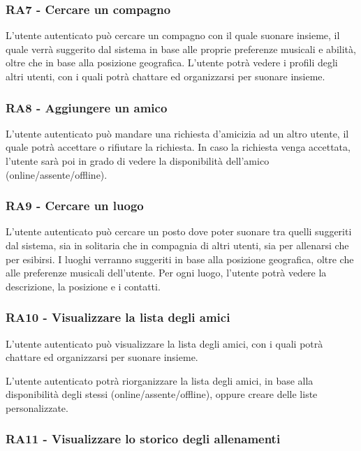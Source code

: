\documentclass[12pt, a4paper]{article}
\begin{document}
\subsubsection*{\hypertarget{RA7}{RA7 - Cercare un compagno}}

L'utente autenticato può cercare un compagno con il quale suonare insieme, il quale verrà suggerito dal sistema in base alle proprie preferenze musicali e abilità, oltre che in base alla posizione geografica. L'utente potrà vedere i profili degli altri utenti, con i quali potrà chattare ed organizzarsi per suonare insieme.

\subsubsection*{\hypertarget{RA8}{RA8 - Aggiungere un amico}}

L'utente autenticato può mandare una richiesta d'amicizia ad un altro utente, il quale potrà accettare o rifiutare la richiesta. In caso la richiesta venga accettata, l'utente sarà poi in grado di vedere la disponibilità dell'amico (online/assente/offline).


\subsubsection*{\hypertarget{RA9}{RA9 - Cercare un luogo}}


L'utente autenticato può cercare un posto dove poter suonare tra quelli suggeriti dal sistema, sia in solitaria che in compagnia di altri utenti, sia per allenarsi che per esibirsi. I luoghi verranno suggeriti in base alla posizione geografica, oltre che alle preferenze musicali dell'utente. Per ogni luogo, l'utente potrà vedere la descrizione, la posizione e i contatti.

\subsubsection*{\hypertarget{RA10}{RA10 - Visualizzare la lista degli amici}}

L'utente autenticato può visualizzare la lista degli amici, con i quali potrà chattare ed organizzarsi per suonare insieme.


L'utente autenticato potrà riorganizzare la lista degli amici, in base alla disponibilità degli stessi (online/assente/offline), oppure creare delle liste personalizzate.


\subsubsection*{\hypertarget{RA11}{RA11 - Visualizzare lo storico degli allenamenti}}
\end{document}
